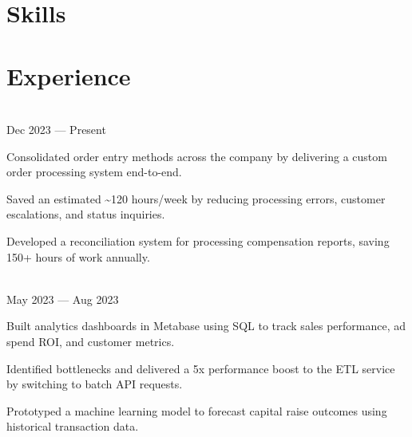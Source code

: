 \documentclass[letterpaper,11pt]{hieudo-build}
\begin{document}


\section{Skills}

{




}

\section{Experience}

 \hfill {} \\
 \hfill Dec 2023 — Present \\
\begin{tightemize}
  \item Consolidated order entry methods across the company by delivering a custom order processing system end-to-end.
  \item Saved an estimated \textasciitilde 120 hours/week by reducing processing errors, customer escalations, and status inquiries.
  \item Developed a reconciliation system for processing compensation reports, saving 150+ hours of work annually.
\end{tightemize}

 \hfill {} \\
 \hfill May 2023 — Aug 2023 \\
\begin{tightemize}
  \item Built analytics dashboards in Metabase using SQL to track sales performance, ad spend ROI, and customer metrics.
  \item Identified bottlenecks and delivered a 5x performance boost to the ETL service by switching to batch API requests.
  \item Prototyped a machine learning model to forecast capital raise outcomes using historical transaction data.
\end{tightemize}
\end{document}
